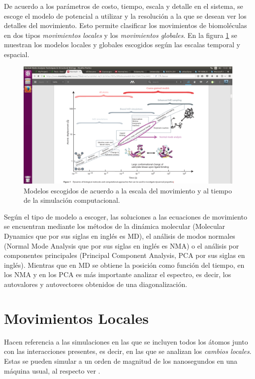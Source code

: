 De acuerdo a los par\'{a}metros de costo, tiempo, escala y detalle en el sistema, se escoge el modelo de potencial a utilizar y la resoluci\'{o}n a la que se desean ver los detalles del movimiento. Esto permite clasificar los movimientos de biomol\'{e}culas en dos tipos \textit{movimientos locales} y los \textit{movimientos globales}. En la figura \ref{fig:esc} se muestran los modelos locales y globales escogidos seg\'{u}n las escalas temporal y espacial.\\
\begin{figure}[h]
\centering%
\includegraphics[trim={10cm 1cm 8cm 10cm},clip,scale=0.3]{Kap2/escalas.png}%
\caption{Modelos escogidos de acuerdo a la escala del movimiento y al tiempo de la simulaci\'{o}n computacional.} \label{fig:esc}
\end{figure}



Seg\'{u}n el tipo de modelo a escoger, las soluciones a las ecuaciones de movimiento se encuentran mediante los m\'{e}todos de la din\'{a}mica molecular (Molecular Dynamics que por sus siglas en ingl\'{e}s es MD), el an\'{a}lisis de modos normales (Normal Mode Analysis que por sus siglas en ingl\'{e}s es NMA) o el an\'{a}lisis por componentes principales (Principal Component Analysis, PCA por sus siglas en ingl\'{e}s). Mientras que en MD se obtiene la posici\'{o}n como funci\'{o}n del tiempo, en los NMA y en los PCA  es m\'{a}s importante analizar el espectro, es decir, los autovalores y autovectores obtenidos de una diagonalizaci\'{o}n.\\

\section{Movimientos Locales}
Hacen referencia a las simulaciones en las que se incluyen todos los \'{a}tomos junto con las interacciones presentes, es decir, en las que se analizan los \textit{cambios locales}. Estas se pueden simular a un orden de magnitud de los nanosegundos en una m\'{a}quina usual, al respecto ver \cite{Gur2013}.\\

